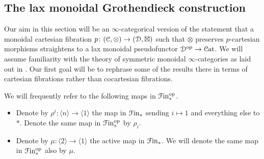\documentclass[main.tex]{subfiles}
\begin{document}

\subsection{The lax monoidal Grothendieck construction}
\label{ssc:the_lax_monoidal_grothendieck_construction}

Our aim in this section will be an $\infty$-categorical version of the statement that a monoidal cartesian fibration $p\colon (\mathcal{C}, \otimes) \to (\mathcal{D}, \boxtimes)$ such that $\otimes$ preserves $p$-cartesian morphisms straightens to a lax monoidal pseudofunctor $\mathcal{D}^{\mathrm{op}} \to \mathcal{C}\mathrm{at}$. We will assume familiarity with the theory of symmetric monoidal $\infty$-categories as laid out in \cite[Chap.~2]{luriehigheralgebra}. Our first goal will be to rephrase some of the results there in terms of cartesian fibrations rather than cocartesian fibrations.

\begin{notation}
  We will frequently refer to the following maps in $\mathcal{F}\mathrm{in}_{*}^{\mathrm{op}}$.
  \begin{itemize}
    \item Denote by $\rho^{i}\colon \langle n \rangle \to \langle 1 \rangle$ the map in $\mathcal{F}\mathrm{in}_{*}$ sending $i \mapsto 1$ and everything else to $\ast$. Denote the same map in $\mathcal{F}\mathrm{in}_{*}^{\mathrm{op}}$ by $\rho_{i}$.

    \item Denote by $\mu\colon \langle 2 \rangle \to \langle 1 \rangle$ the active map in $\mathcal{F}\mathrm{in}_{*}$. We will denote the same map in $\mathcal{F}\mathrm{in}_{*}^{\mathrm{op}}$ also by $\mu$.
  \end{itemize}
\end{notation}
\end{document}
